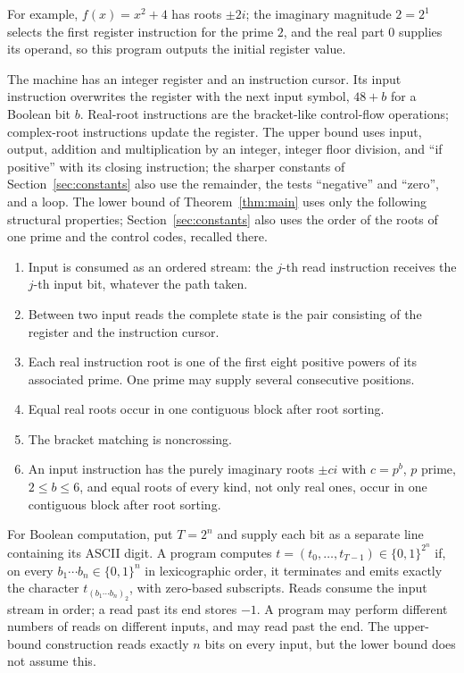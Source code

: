 \documentclass[11pt]{article}
\theoremstyle{remark}
\begin{document}
For example, $f(x)=x^2+4$ has roots $\pm2i$; the imaginary magnitude
$2=2^1$ selects the first register instruction for the prime $2$, and the real
part $0$ supplies its operand, so this program outputs the initial register value.

The machine has an integer register and an instruction cursor.  Its input
instruction overwrites the register with the next input symbol, $48+b$ for a
Boolean bit $b$.  Real-root instructions are the bracket-like control-flow
operations; complex-root instructions update the register.  The upper bound
uses input, output, addition and multiplication by an integer, integer floor
division, and ``if positive'' with its closing instruction; the sharper
constants of Section~\ref{sec:constants} also use the remainder, the tests
``negative'' and ``zero'', and a loop.  The lower bound of
Theorem~\ref{thm:main} uses only the following structural properties;
Section~\ref{sec:constants} also uses the order of the roots of one prime and the
control codes, recalled there.

\begin{enumerate}
\item Input is consumed as an ordered stream: the $j$-th read instruction
receives the $j$-th input bit, whatever the path taken.
\item Between two input reads the complete state is the pair consisting of
the register and the instruction cursor.
\item Each real instruction root is one of the first eight positive powers of
its associated prime.  One prime may supply several consecutive positions.
\item Equal real roots occur in one contiguous block after root sorting.
\item The bracket matching is noncrossing.
\item An input instruction has the purely imaginary roots $\pm ci$ with
$c=p^b$, $p$ prime, $2\le b\le6$, and equal roots of every kind, not only
real ones, occur in one contiguous block after root sorting.
\end{enumerate}

For Boolean computation, put $T=2^n$ and supply each bit as a separate line
containing its ASCII digit.  A program computes
$t=(t_0,\ldots,t_{T-1})\in\{0,1\}^{2^n}$ if, on every
$b_1\cdots b_n\in\{0,1\}^n$ in lexicographic order, it terminates and emits
exactly the character $t_{(b_1\cdots b_n)_2}$, with zero-based subscripts.
Reads consume the input stream in order; a read past its end stores $-1$.
A program may perform different numbers of reads on different inputs, and
may read past the end.  The upper-bound construction reads exactly $n$ bits
on every input, but the lower bound does not assume this.
\end{document}
